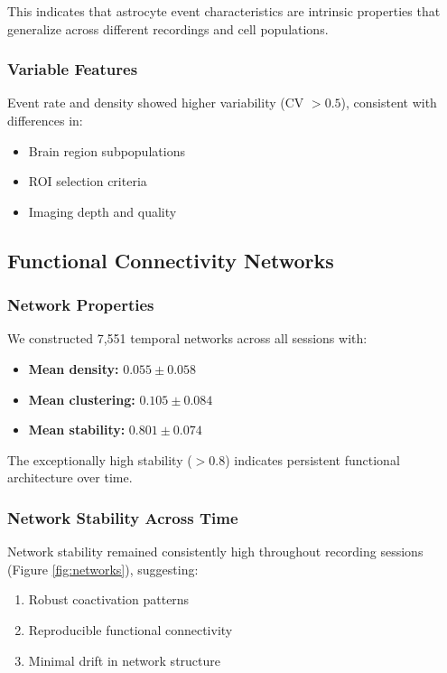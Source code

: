 \documentclass[11pt,twocolumn]{article}
\begin{document}
This indicates that astrocyte event characteristics are intrinsic properties that generalize across different recordings and cell populations.

\subsubsection{Variable Features}
Event rate and density showed higher variability (CV $> 0.5$), consistent with differences in:
\begin{itemize}
    \item Brain region subpopulations
    \item ROI selection criteria
    \item Imaging depth and quality
\end{itemize}

\subsection{Functional Connectivity Networks}

\subsubsection{Network Properties}
We constructed 7,551 temporal networks across all sessions with:

\begin{itemize}
    \item \textbf{Mean density:} $0.055 \pm 0.058$
    \item \textbf{Mean clustering:} $0.105 \pm 0.084$
    \item \textbf{Mean stability:} $\mathbf{0.801 \pm 0.074}$
\end{itemize}

The exceptionally high stability ($> 0.8$) indicates persistent functional architecture over time.

\subsubsection{Network Stability Across Time}
Network stability remained consistently high throughout recording sessions (Figure \ref{fig:networks}), suggesting:
\begin{enumerate}
    \item Robust coactivation patterns
    \item Reproducible functional connectivity
    \item Minimal drift in network structure
\end{enumerate}
\end{document}
